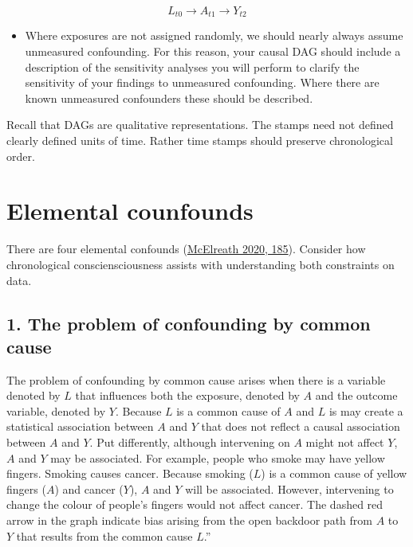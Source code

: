 \documentclass[
  singlecolumn]{report}
\providecommand{\tightlist}{%
  \setlength{\itemsep}{0pt}\setlength{\parskip}{0pt}}\usepackage{longtable,booktabs,array}
\begin{document}
\[
L_{t0} \rightarrow A_{t1} \rightarrow Y_{t2}
\]

\begin{itemize}
\tightlist
\item
  Where exposures are not assigned randomly, we should nearly always
  assume unmeasured confounding. For this reason, your causal DAG should
  include a description of the sensitivity analyses you will perform to
  clarify the sensitivity of your findings to unmeasured confounding.
  Where there are known unmeasured confounders these should be
  described.
\end{itemize}

Recall that DAGs are qualitative representations. The stamps need not
defined clearly defined units of time. Rather time stamps should
preserve chronological order.

\hypertarget{elemental-counfounds}{%
\section{Elemental counfounds}\label{elemental-counfounds}}

There are four elemental confounds
(\protect\hyperlink{ref-mcelreath2020}{McElreath 2020, 185}). Consider
how chronological consciensciousness assists with understanding both
constraints on data.

\hypertarget{the-problem-of-confounding-by-common-cause}{%
\subsection{1. The problem of confounding by common
cause}\label{the-problem-of-confounding-by-common-cause}}

The problem of confounding by common cause arises when there is a
variable denoted by \(L\) that influences both the exposure, denoted by
\(A\) and the outcome variable, denoted by \(Y.\) Because \(L\) is a
common cause of \(A\) and \(L\) is may create a statistical association
between \(A\) and \(Y\) that does not reflect a causal association
between \(A\) and \(Y\). Put differently, although intervening on \(A\)
might not affect \(Y\), \(A\) and \(Y\) may be associated. For example,
people who smoke may have yellow fingers. Smoking causes cancer. Because
smoking (\(L\)) is a common cause of yellow fingers (\(A\)) and cancer
(\(Y\)), \(A\) and \(Y\) will be associated. However, intervening to
change the colour of people's fingers would not affect cancer. The
dashed red arrow in the graph indicate bias arising from the open
backdoor path from \(A\) to \(Y\) that results from the common cause
\(L\).''
\end{document}
